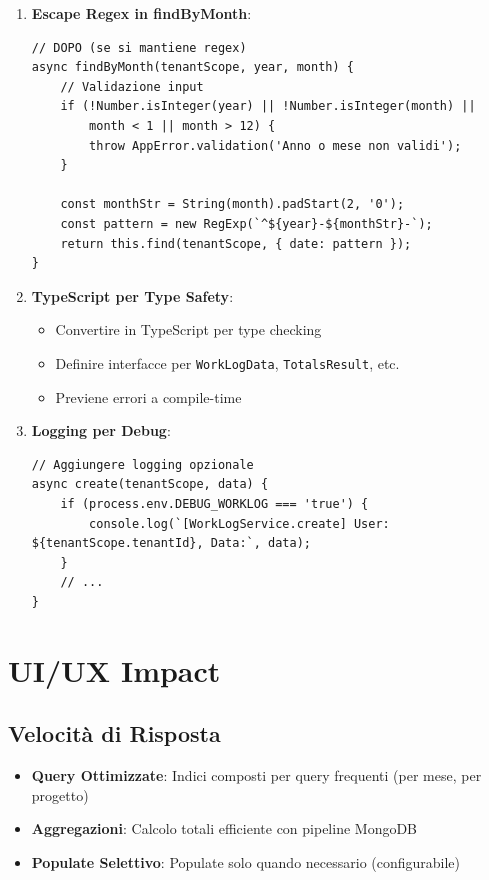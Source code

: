 \documentclass[11pt,a4paper]{article}
\begin{document}
\begin{enumerate}
    \item \textbf{Escape Regex in findByMonth}:
    \begin{lstlisting}
// DOPO (se si mantiene regex)
async findByMonth(tenantScope, year, month) {
    // Validazione input
    if (!Number.isInteger(year) || !Number.isInteger(month) || 
        month < 1 || month > 12) {
        throw AppError.validation('Anno o mese non validi');
    }
    
    const monthStr = String(month).padStart(2, '0');
    const pattern = new RegExp(`^${year}-${monthStr}-`);
    return this.find(tenantScope, { date: pattern });
}
    \end{lstlisting}
    
    \item \textbf{TypeScript per Type Safety}:
    \begin{itemize}
        \item Convertire in TypeScript per type checking
        \item Definire interfacce per \texttt{WorkLogData}, \texttt{TotalsResult}, etc.
        \item Previene errori a compile-time
    \end{itemize}
    
    \item \textbf{Logging per Debug}:
    \begin{lstlisting}
// Aggiungere logging opzionale
async create(tenantScope, data) {
    if (process.env.DEBUG_WORKLOG === 'true') {
        console.log(`[WorkLogService.create] User: ${tenantScope.tenantId}, Data:`, data);
    }
    // ...
}
    \end{lstlisting}
\end{enumerate}

\section{UI/UX Impact}

\subsection{Velocità di Risposta}

\begin{itemize}
    \item \textbf{Query Ottimizzate}: Indici composti per query frequenti (per mese, per progetto)
    \item \textbf{Aggregazioni}: Calcolo totali efficiente con pipeline MongoDB
    \item \textbf{Populate Selettivo}: Populate solo quando necessario (configurabile)
\end{itemize}
\end{document}
